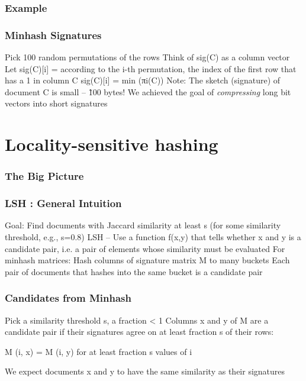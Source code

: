 \documentclass[svgnames]{beamer}
\begin{document}
  
\begin{frame} \frametitle{Example}


\end{frame}

  
\begin{frame} \frametitle{Minhash Signatures}

Pick 100 random permutations of the rows
Think of sig(C) as a column vector
Let sig(C)[i] = according to the i-th permutation, the index of the first row that has a 1 in column C
   sig(C)[i] = min (πi(C))
Note: The sketch (signature) of document C is small -- \~100 bytes!
We achieved the goal of \emph{compressing} long bit vectors into short signatures

\end{frame}

  
\section{Locality-sensitive hashing}

  
\begin{frame} \frametitle{The Big Picture}


\end{frame}

  
\begin{frame} \frametitle{LSH : General Intuition}

Goal: Find documents with Jaccard similarity at least s (for some similarity threshold, e.g., s=0.8)
LSH -- Use a function f(x,y) that tells whether x and y is a candidate pair, i.e. a pair of elements whose similarity must be evaluated
For minhash matrices:
  Hash columns of signature matrix M to many buckets
  Each pair of documents that hashes into the same bucket is a candidate pair
  
\end{frame}

  
\begin{frame} \frametitle{Candidates from Minhash}

Pick a similarity threshold s, a fraction < 1
Columns x and y of M are a candidate pair if their signatures agree on at least fraction s of their rows: 

M (i, x) = M (i, y) for at least fraction s values of i

We expect documents x and y to have the same similarity as their signatures

\end{frame}
\end{document}
